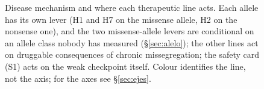 \documentclass[10pt]{article}
\begin{document}
\begin{figure}[htbp]
\caption{Disease mechanism and where each therapeutic line acts. Each allele has its own lever (H1 and H7 on the
missense allele, H2 on the nonsense one), and the two missense-allele levers are conditional on an allele class nobody has measured
(§\ref{sec:alelo}); the other lines act on druggable consequences of chronic missegregation; the safety card (S1)
acts on the weak checkpoint itself. Colour identifies the line, not the axis; for the axes see §\ref{sec:ejes}.}
\label{fig:mecanismo}
\end{figure}
\end{document}
